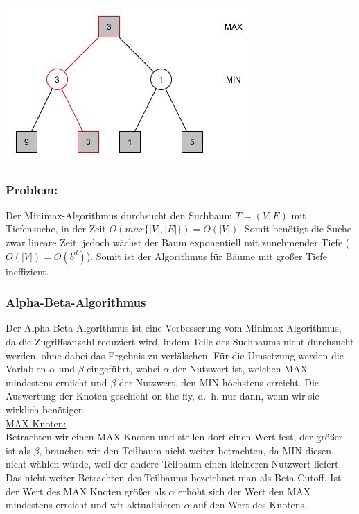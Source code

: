 \begin{center}
	\includegraphics[width = 7 cm]{chapters/minimax/jpg/Graph-Minmax4.jpg}
\end{center}

\vskip 60pt



\subsubsection*{Problem:} Der Minimax-Algorithmus durchsucht den Suchbaum $T=(V, E)$ mit Tiefensuche, in der Zeit $O(max \{|V|, |E|\}) = O(|V|)$. Somit benötigt die Suche zwar lineare Zeit, jedoch wächst der Baum exponentiell mit zunehmender Tiefe ($O(|V|)=O(b^d)$). Somit ist der Algorithmus für Bäume mit großer Tiefe ineffizient.


\subsubsection*{Alpha-Beta-Algorithmus}
 Der Alpha-Beta-Algorithmus ist eine Verbesserung vom Minimax-Algorithmus, da die Zugriffsanzahl reduziert wird, indem Teile des Suchbaums nicht durchsucht werden, ohne dabei das Ergebnis zu verfälschen. Für die Umsetzung werden die Variablen $\alpha$ und $\beta$ eingeführt, wobei $\alpha$ der Nutzwert ist, welchen MAX mindestens erreicht und $\beta$ der Nutzwert, den MIN höchstens erreicht. Die Auswertung der Knoten geschieht on-the-fly, d.~h. nur dann, wenn wir sie wirklich benötigen. \\

 \underline{MAX-Knoten:}\\
 Betrachten wir einen MAX Knoten und stellen dort einen Wert fest, der größer ist als $\beta$, brauchen wir den Teilbaum nicht weiter betrachten, da MIN diesen nicht wählen würde, weil der andere Teilbaum einen kleineren Nutzwert liefert. Das nicht weiter Betrachten des Teilbaums bezeichnet man als Beta-Cutoff. Ist  der Wert des MAX Knoten größer als $\alpha$ erhöht sich der Wert den MAX mindestens erreicht und wir aktualisieren $\alpha$ auf den Wert des Knotens.  \\

